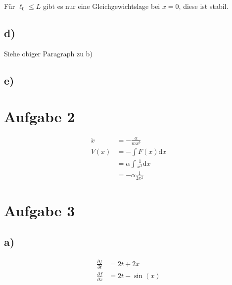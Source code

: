 \documentclass[12pt,a4paper,notitlepage]{article}
\newcommand{\diff}{\mathrm{d}}
\newcommand{\aufgabe}[1]{\section*{\setcounter{section}{#1}Aufgabe #1}}
\begin{document}
Für $\ell_0\leq L$ gibt es nur eine Gleichgewichtslage bei $x=0$, diese ist stabil.
\subsection*{d)}
Siehe obiger Paragraph zu b)
\subsection*{e)}

\aufgabe{2}
\begin{align}
\ddot x&=-\frac{\alpha}{mx^3}\\
V(x)&=-\int F(x)\diff x\\
&=\alpha\int\frac{1}{x^3}\diff x\\
&=-\alpha\frac{1}{2x^2}
\end{align}
\aufgabe{3}
\subsection*{a)}
\begin{align}
\frac{\partial f}{\partial t}&=2t+2x\\
\frac{\partial f}{\partial x}&=2t-\sin(x)
\end{align}
\end{document}
